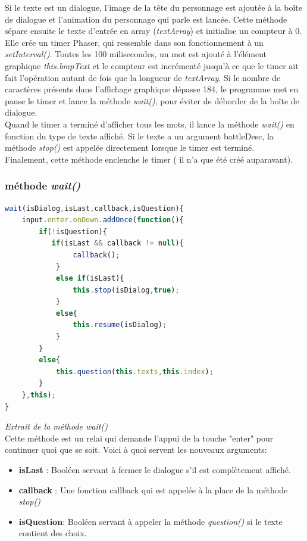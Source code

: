 \documentclass[11pt]{article}
\begin{document}
\begin{appendices}
Si le texte est un dialogue, l'image de la tête du personnage est ajoutée à la boîte de dialogue et l'animation du personnage qui parle est lancée.
Cette méthode sépare ensuite le texte d'entrée en array (\textit{textArray}) et initialise un compteur à 0. Elle crée un timer Phaser, qui ressemble dans son fonctionnement à un \textit{setInterval()}. Toutes les 100 milisecondes, un mot est ajouté à l'élément graphique \textit{this.bmpText} et le compteur est incrémenté jusqu'à ce que le timer ait fait l'opération autant de fois que la longueur de \textit{textArray}. Si le nombre de caractères présents dans l'affichage graphique dépasse 184, le programme met en pause le timer et lance la méthode \textit{wait()}, pour éviter de déborder de la boîte de dialogue.\\

 Quand le timer a terminé d'afficher tous les mots, il lance la méthode \textit{wait()} en fonction du type de texte affiché. Si le texte a un argument battleDesc, la méthode \textit{stop()} est appelée directement lorsque le timer est terminé.\\
 
Finalement, cette méthode enclenche le timer ( il n'a que été créé auparavant).
 
\subsubsection{méthode \textit{wait()}}
\begin{lstlisting}[language=JavaScript]
wait(isDialog,isLast,callback,isQuestion){ 
    input.enter.onDown.addOnce(function(){ 
    	if(!isQuestion){
     	   if(isLast && callback != null){
       	     	callback();
       	 	}
        	else if(isLast){
            	this.stop(isDialog,true);
        	}
        	else{
            	this.resume(isDialog);
        	}
    	}
    	else{
        	this.question(this.texts,this.index);
    	}
	},this);
}
\end{lstlisting} 
\textit{Extrait de la méthode wait()}\\ Cette méthode est un relai qui demande l'appui de la touche "enter" pour continuer quoi que se soit. Voici à quoi servent les nouveaux arguments: 
\begin{itemize}
\item \textbf{isLast} : Booléen servant à fermer le dialogue s'il est complètement affiché.
\item \textbf{callback} : Une fonction callback qui est appelée à la place de la méthode \textit{stop()}
\item \textbf{isQuestion}: Booléen servant à appeler la méthode \textit{question()} si le texte contient des choix.
\end{itemize}

\end{appendices}
\end{document}

